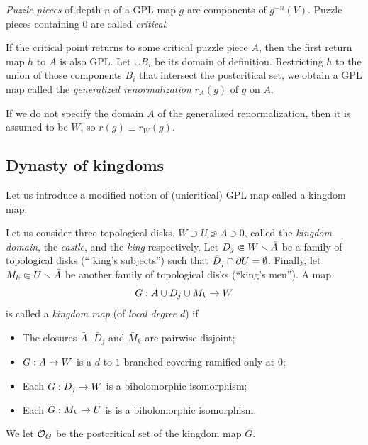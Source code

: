 \msk
  {\it Puzzle pieces} of depth $n$ of a GPL map $g$ are components of $g^{-n}(V)$. Puzzle pieces containing
$0$ are called {\it critical}. 

If the critical point returns to some critical puzzle piece $A$,
then  the first return map $h$ to $A$ is also GPL. Let   $\cup B_i$ be its domain of definition.  
Restricting $h$ to the union of those components $B_i$ that intersect the postcritical set,
we obtain a GPL map called the {\it generalized renormalization} 
$r_A(g)$ of $g$ on $A$. 

If we do not specify the domain $A$ of the generalized renormalization,
then it is assumed to be $W$, so $r(g)\equiv r_W(g)$. 


                                                                                                   

\subsection{Dynasty of kingdoms}\label{dynasty}
Let us introduce a modified notion of (unicritical) GPL map called a kingdom map. 

Let us consider three topological disks,  $W\supset U\Supset  A\ni 0$,
called the {\it kingdom domain}, the {\it castle},  and the {\it king} respectively. 
Let $D_j\Subset W\smallsetminus\bar A$ be a family of topological disks (`` king's subjects'')
such that $\bar D_j\cap \partial U=\emptyset$.
Finally, let  $M_k\Subset U\smallsetminus\bar A$ be another family of topological disks 
(``king's men'').
A map
$$
     G: A \cup D_j\cup M_k \rightarrow W
$$
is called a {\it kingdom map} (of {\it local degree} $d$) if
\begin{itemize}
 \item  The closures $\bar A$, $\bar D_j$ and $\bar M_k$ are pairwise disjoint; 
 \item $G: A\rightarrow W$ is  a $d$-to-$1$ branched covering ramified only at 0;
 \item Each $G: D_j\rightarrow W$  is a biholomorphic isomorphism; 
 \item Each $G: M_k\rightarrow U$ is is a biholomorphic isomorphism. 
\end{itemize}
We let ${\cal O}_G$ be the postcritical set of the kingdom map $G$. 


